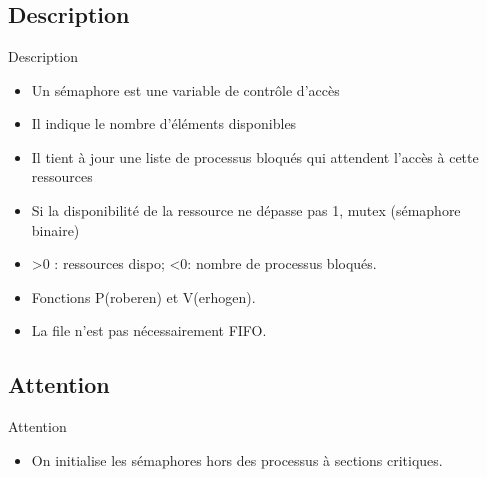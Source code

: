 \section{\sectitle}
\begin{frame}{\sectitle}
\def\subsectitle{Description}
\subsection{\subsectitle}
\begin{block}{\subsectitle}
\begin{itemize}
\item Un sémaphore est une variable de contrôle d'accès
\item Il indique le nombre d'éléments disponibles
\item Il tient à jour une liste de processus bloqués qui attendent l'accès à
cette ressources
\item Si la disponibilité de la ressource ne dépasse pas 1, mutex (sémaphore
binaire)
\item >0 : ressources dispo; <0: nombre de processus bloqués.
\item Fonctions P(roberen) et V(erhogen).
\item La file n'est pas nécessairement FIFO.
\end{itemize}
\end{block}
\def\subsectitle{Attention}
\subsection{\subsectitle}
\begin{alertblock}{\subsectitle}
\begin{itemize}
\item On initialise les sémaphores hors des processus à sections critiques.
\end{itemize}
\end{alertblock}
\end{frame}

\def\sectitle{Sémaphore}
